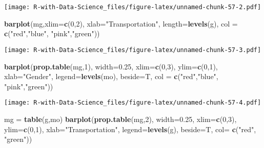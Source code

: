 \documentclass[
]{article}
\newenvironment{Shaded}{\begin{snugshade}}{\end{snugshade}}
\newcommand{\AttributeTok}[1]{\textcolor[rgb]{0.13,0.29,0.53}{#1}}
\newcommand{\DecValTok}[1]{\textcolor[rgb]{0.00,0.00,0.81}{#1}}
\newcommand{\FloatTok}[1]{\textcolor[rgb]{0.00,0.00,0.81}{#1}}
\newcommand{\FunctionTok}[1]{\textcolor[rgb]{0.13,0.29,0.53}{\textbf{#1}}}
\newcommand{\NormalTok}[1]{#1}
\newcommand{\OtherTok}[1]{\textcolor[rgb]{0.56,0.35,0.01}{#1}}
\newcommand{\StringTok}[1]{\textcolor[rgb]{0.31,0.60,0.02}{#1}}
\begin{document}
\texttt{[image: R-with-Data-Science\_files/figure-latex/unnamed-chunk-57-2.pdf]}

\begin{Shaded}
\begin{Highlighting}[]
\FunctionTok{barplot}\NormalTok{(mg,}\AttributeTok{xlim=}\FunctionTok{c}\NormalTok{(}\DecValTok{0}\NormalTok{,}\DecValTok{2}\NormalTok{), }\AttributeTok{xlab=}\StringTok{"Transportation"}\NormalTok{, }\AttributeTok{length=}\FunctionTok{levels}\NormalTok{(g), }\AttributeTok{col =} \FunctionTok{c}\NormalTok{(}\StringTok{"red"}\NormalTok{,}\StringTok{"blue"}\NormalTok{, }\StringTok{"pink"}\NormalTok{,}\StringTok{"green"}\NormalTok{))}
\end{Highlighting}
\end{Shaded}

\texttt{[image: R-with-Data-Science\_files/figure-latex/unnamed-chunk-57-3.pdf]}

\begin{Shaded}
\begin{Highlighting}[]
\FunctionTok{barplot}\NormalTok{(}\FunctionTok{prop.table}\NormalTok{(mg,}\DecValTok{1}\NormalTok{), }\AttributeTok{width=}\FloatTok{0.25}\NormalTok{, }\AttributeTok{xlim=}\FunctionTok{c}\NormalTok{(}\DecValTok{0}\NormalTok{,}\DecValTok{3}\NormalTok{), }\AttributeTok{ylim=}\FunctionTok{c}\NormalTok{(}\DecValTok{0}\NormalTok{,}\DecValTok{1}\NormalTok{), }\AttributeTok{xlab=}\StringTok{"Gender"}\NormalTok{, }\AttributeTok{legend=}\FunctionTok{levels}\NormalTok{(mo), }\AttributeTok{beside=}\NormalTok{T, }\AttributeTok{col =} \FunctionTok{c}\NormalTok{(}\StringTok{"red"}\NormalTok{,}\StringTok{"blue"}\NormalTok{, }\StringTok{"pink"}\NormalTok{,}\StringTok{"green"}\NormalTok{))}
\end{Highlighting}
\end{Shaded}

\texttt{[image: R-with-Data-Science\_files/figure-latex/unnamed-chunk-57-4.pdf]}

\begin{Shaded}
\begin{Highlighting}[]
\NormalTok{mg }\OtherTok{=} \FunctionTok{table}\NormalTok{(g,mo)}
\FunctionTok{barplot}\NormalTok{(}\FunctionTok{prop.table}\NormalTok{(mg,}\DecValTok{2}\NormalTok{), }\AttributeTok{width=}\FloatTok{0.25}\NormalTok{, }\AttributeTok{xlim=}\FunctionTok{c}\NormalTok{(}\DecValTok{0}\NormalTok{,}\DecValTok{3}\NormalTok{), }\AttributeTok{ylim=}\FunctionTok{c}\NormalTok{(}\DecValTok{0}\NormalTok{,}\DecValTok{1}\NormalTok{), }\AttributeTok{xlab=}\StringTok{"Transportation"}\NormalTok{, }\AttributeTok{legend=}\FunctionTok{levels}\NormalTok{(g), }\AttributeTok{beside=}\NormalTok{T, }\AttributeTok{col=} \FunctionTok{c}\NormalTok{(}\StringTok{"red"}\NormalTok{, }\StringTok{"green"}\NormalTok{))}
\end{Highlighting}
\end{Shaded}
\end{document}
